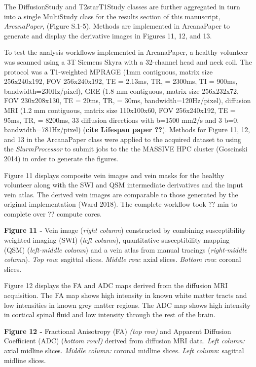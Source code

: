 The DiffusionStudy and T2starT1Study classes are further aggregated in
turn into a single MultiStudy class for the results section of this
manuscript\emph{, ArcanaPaper}, (Figure S.1-5). Methods are implemented
in ArcanaPaper to generate and display the derivative images in Figures
11, 12, and 13.

To test the analysis workflows implemented in ArcanaPaper, a healthy
volunteer was scanned using a 3T Siemens Skyra with a 32-channel head
and neck coil. The protocol was a T1-weighted MPRAGE (1mm contiguous,
matrix size 256x240x192, FOV 256x240x192, TE = 2.13ms, TR, = 2300ms, TI
= 900ms, bandwidth=230Hz/pixel), GRE (1.8 mm contiguous, matrix size
256x232x72, FOV 230x208x130, TE = 20ms, TR, = 30ms,
bandwidth=120Hz/pixel), diffusion MRI (1.2 mm contiguous, matrix size
110x100x60, FOV 256x240x192, TE = 95ms, TR, = 8200ms, 33 diffusion
directions with b=1500 mm2/s and 3 b=0, bandwidth=781Hz/pixel)
(\textbf{cite Lifespan paper ??}). Methods for Figure 11, 12, and 13 in
the ArcanaPaper class were applied to the acquired dataset to using the
\emph{SlurmProcessor} to submit jobs to the the MASSIVE HPC cluster
(Goscinski 2014) in order to generate the figures.

Figure 11 displays composite vein images and vein masks for the healthy
volunteer along with the SWI and QSM intermediate derivatives and the
input vein atlas. The derived vein images are comparable to those
generated by the original implementation (Ward 2018). The complete
workflow took ?? min to complete over ?? compute cores.


\textbf{Figure 11 -} Vein image (\emph{right column}) constructed by
combining susceptibility weighted imaging (SWI) (\emph{left column}),
quantitative susceptibility mapping (QSM) (\emph{left-middle column})
and a vein atlas from manual tracings (\emph{right-middle column}).
\emph{Top row}: sagittal slices. \emph{Middle row}: axial slices.
\emph{Bottom row}: coronal slices.

Figure 12 displays the FA and ADC maps derived from the diffusion MRI
acquisition. The FA map shows high intensity in known white matter
tracts and low intensities in known grey matter regions. The ADC map
shows high intensity in cortical spinal fluid and low intensity through
the rest of the brain.


\textbf{Figure 12 -} Fractional Anisotropy (FA) \emph{(top row)} and
Apparent Diffusion Coefficient (ADC) (\emph{bottom rowI)} derived from
diffusion MRI data. \emph{Left column:} axial midline slices.
\emph{Middle column:} coronal midline slices. \emph{Left column}:
sagittal midline slices.

